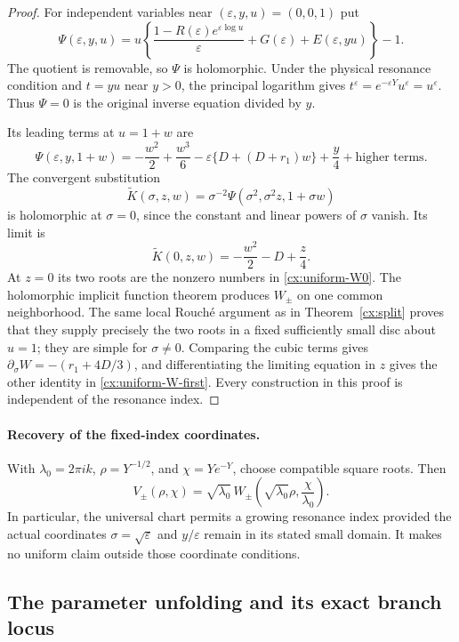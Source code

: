 \documentclass[11pt,a4paper]{article}
\numberwithin{equation}{section}
\theoremstyle{definition}
\theoremstyle{remark}
\begin{document}
\begin{proof}
For independent variables near $(\varepsilon,y,u)=(0,0,1)$ put
\[
 \Psi(\varepsilon,y,u)=u\left\{
 \frac{1-R(\varepsilon)e^{\varepsilon\log u}}{\varepsilon}
       +G(\varepsilon)+E(\varepsilon,yu)\right\}-1.
\]
The quotient is removable, so $\Psi$ is holomorphic. Under the physical
resonance condition and $t=yu$ near $y>0$, the principal logarithm gives
$t^\varepsilon=e^{-\varepsilon Y}u^\varepsilon=u^\varepsilon$.
Thus $\Psi=0$ is the original inverse equation divided by $y$.

Its leading terms at $u=1+w$ are
\[
 \Psi(\varepsilon,y,1+w)
 =-\frac{w^2}{2}+\frac{w^3}{6}
   -\varepsilon\{D+(D+r_1)w\}+\frac y4
   +\text{higher terms}.
\]
The convergent substitution
\[
 \widetilde K(\sigma,z,w)
   =\sigma^{-2}\Psi(\sigma^2,\sigma^2z,1+\sigma w)
\]
is holomorphic at $\sigma=0$, since the constant and linear powers of
$\sigma$ vanish. Its limit is
\[
 \widetilde K(0,z,w)=-\frac{w^2}{2}-D+\frac z4.
\]
At $z=0$ its two roots are the nonzero numbers in
\eqref{cx:uniform-W0}. The holomorphic implicit function theorem produces
$W_\pm$ on one common neighborhood. The same local Rouch\'e argument as
in Theorem~\ref{cx:split} proves that they supply precisely the two roots
in a fixed sufficiently small disc about $u=1$; they are simple for
$\sigma\ne0$. Comparing the cubic terms gives
$\partial_\sigma W=-(r_1+4D/3)$, and differentiating the limiting equation
in $z$ gives the other identity in \eqref{cx:uniform-W-first}.
Every construction in this proof is independent of the resonance index.
\end{proof}

\paragraph{Recovery of the fixed-index coordinates.}
With $\lambda_0=2\pi i k$, $\rho=Y^{-1/2}$, and $\chi=Ye^{-Y}$,
choose compatible square roots. Then
\[
 V_\pm(\rho,\chi)=\sqrt{\lambda_0}\,
 W_\pm\left(\sqrt{\lambda_0}\rho,\frac\chi{\lambda_0}\right).
\]
In particular, the universal chart permits a growing resonance index
provided the actual coordinates $\sigma=\sqrt{\varepsilon}$ and
$y/\varepsilon$ remain in its stated small domain. It makes no uniform
claim outside those coordinate conditions.

\subsection{The parameter unfolding and its exact branch locus}
\end{document}
